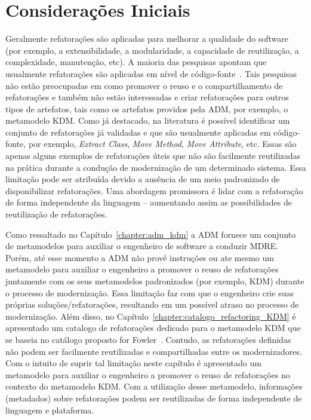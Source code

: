 \section{Considerações Iniciais}\label{sec:consideracoes_iniciais}
Geralmente refatorações são aplicadas para melhorar a qualidade do software (por exemplo, a extensibilidade, a modularidade, a capacidade de reutilização, a complexidade, manutenção, etc). 
A maioria das pesquisas apontam que usualmente refatorações são aplicadas em nível de código-fonte~\cite{Fowler1999, Demeyer1, Demeyer2, Opdy92b}. Tais pesquisas não estão preocupadas em como promover o reuso e o compartilhamento de refatorações e também não estão interessadas e criar refatorações para outros tipos de artefatos, tais como os artefatos providos pela ADM, por exemplo, o metamodelo KDM. 
%
Como já destacado, na literatura é possível identificar um conjunto de refatorações já validadas e que são usualmente aplicadas em código-fonte, por exemplo, \textit{Extract Class}, \textit{Move Method}, \textit{Move Attribute}, etc. Essas são apenas alguns exemplos de refatorações úteis que não são facilmente reutilizadas na prática durante a condução de modernização de um determinado sistema. Essa limitação pode ser atribuída devido a ausência de um meio padronizado de disponibilizar refatorações. 
Uma abordagem promissora é lidar com a refatoração de forma independente da linguagem – aumentando assim as possibilidades de reutilização de refatorações.

Como ressaltado no Capítulo~\ref{chapter:adm_kdm} a ADM fornece um conjunto de metamodelos para auxiliar o engenheiro de software a conduzir MDRE. 
Porém, até esse momento a ADM não provê instruções ou ate mesmo um metamodelo para auxiliar o engenheiro a promover o reuso de refatorações juntamente com os seus metamodelos padronizados (por exemplo, KDM) durante o processo de modernização. 
Essa limitação faz com que o engenheiro crie suas próprias soluções/refatorações, resultando em um possível atraso no processo de modernização. 
Além disso, no Capítulo~\ref{chapter:catalogo_refactoring_KDM} é apresentado um catalogo de refatorações dedicado para o metamodelo KDM que se baseia no catálogo proposto for Fowler~\cite{Fowler1999}. Contudo, as refatorações definidas não podem ser facilmente reutilizadas e compartilhadas entre os modernizadores. 
Com o intuito de suprir tal limitação neste capítulo é apresentado um metamodelo para auxiliar o engenheiro a promover o reuso de refatorações no contexto do metamodelo KDM. Com a utilização desse metamodelo, informações (metadados) sobre refatorações podem ser reutilizadas de forma independente de linguagem e plataforma. 

